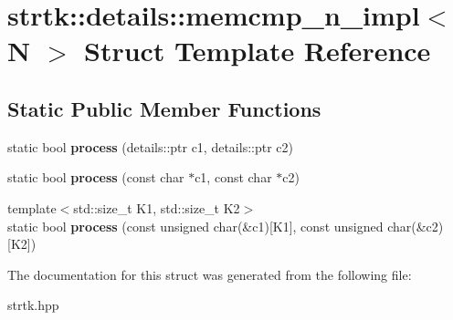 \hypertarget{structstrtk_1_1details_1_1memcmp__n__impl}{\section{strtk\-:\-:details\-:\-:memcmp\-\_\-n\-\_\-impl$<$ N $>$ Struct Template Reference}
\label{structstrtk_1_1details_1_1memcmp__n__impl}
}
\subsection*{Static Public Member Functions}
\begin{DoxyCompactItemize}
\item 
\hypertarget{structstrtk_1_1details_1_1memcmp__n__impl_ab401e7fc3f42331a48c32ed2f7f0c394}{static bool {\bfseries process} (details\-::ptr c1, details\-::ptr c2)}\label{structstrtk_1_1details_1_1memcmp__n__impl_ab401e7fc3f42331a48c32ed2f7f0c394}

\item 
\hypertarget{structstrtk_1_1details_1_1memcmp__n__impl_a23704f4d2b4fab37b951c60dc5295cac}{static bool {\bfseries process} (const char $\ast$c1, const char $\ast$c2)}\label{structstrtk_1_1details_1_1memcmp__n__impl_a23704f4d2b4fab37b951c60dc5295cac}

\item 
\hypertarget{structstrtk_1_1details_1_1memcmp__n__impl_a3d00f8b30c68c40a01ffcc05158dcecd}{{\footnotesize template$<$std\-::size\-\_\-t K1, std\-::size\-\_\-t K2$>$ }\\static bool {\bfseries process} (const unsigned char(\&c1)\mbox{[}K1\mbox{]}, const unsigned char(\&c2)\mbox{[}K2\mbox{]})}\label{structstrtk_1_1details_1_1memcmp__n__impl_a3d00f8b30c68c40a01ffcc05158dcecd}

\end{DoxyCompactItemize}


The documentation for this struct was generated from the following file\-:\begin{DoxyCompactItemize}
\item 
strtk.\-hpp\end{DoxyCompactItemize}
